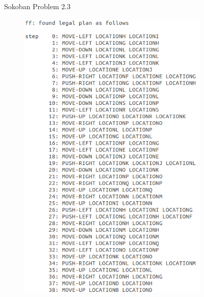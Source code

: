 \documentclass[10pt, letter]{article}
\begin{document}
\begin{figure} [h!]
\begin{subfigure}{\textwidth}
\end{subfigure}%
\caption{Sokoban Problem 2.3}
\label{fig_prob2_3}
\end{figure}

\begin{figure} [h!]
\centering
\begin{subfigure}{.5\textwidth}
  \centering
  \includegraphics[scale = 0.3]{images/FF_Solution_p2_challenge_1}
\end{subfigure}%
\begin{subfigure}{.5\textwidth}
  \centering

\end{subfigure}
\end{figure}
\end{document}
